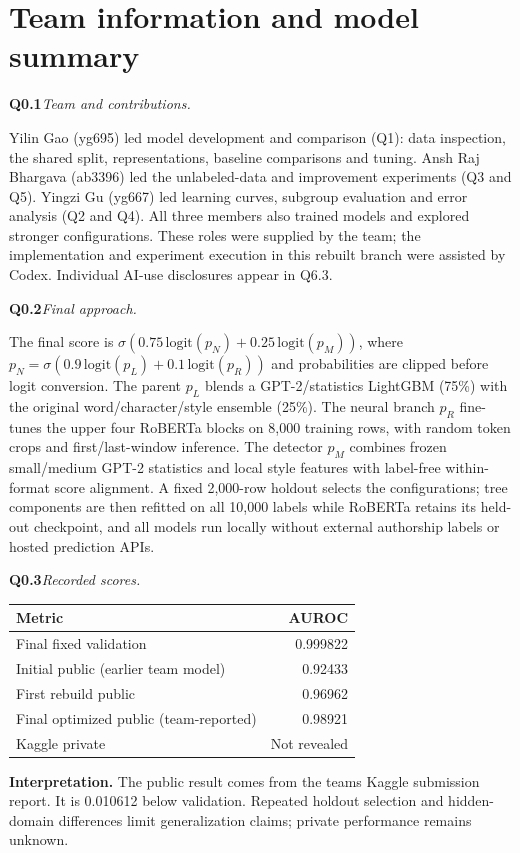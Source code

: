 \documentclass[10pt,letterpaper]{article}
\newcommand{\q}[2]{\needspace{4\baselineskip}\par\addvspace{7pt}\textbf{#1}\quad\textit{#2}\par\nobreak}
\begin{document}
\section*{Team information and model summary}
\q{Q0.1}{Team and contributions.}Yilin Gao (yg695) led model development and comparison (Q1): data inspection, the shared split, representations, baseline comparisons and tuning. Ansh Raj Bhargava (ab3396) led the unlabeled-data and improvement experiments (Q3 and Q5). Yingzi Gu (yg667) led learning curves, subgroup evaluation and error analysis (Q2 and Q4). All three members also trained models and explored stronger configurations. These roles were supplied by the team; the implementation and experiment execution in this rebuilt branch were assisted by Codex. Individual AI-use disclosures appear in Q6.3.
\q{Q0.2}{Final approach.}
The final score is $\sigma(0.75\,\mathrm{logit}(p_N)+0.25\,\mathrm{logit}(p_M))$, where $p_N=\sigma(0.9\,\mathrm{logit}(p_L)+0.1\,\mathrm{logit}(p_R))$ and probabilities are clipped before logit conversion.
The parent $p_L$ blends a GPT-2/statistics LightGBM (75\%) with the original word/character/style ensemble (25\%).
The neural branch $p_R$ fine-tunes the upper four RoBERTa blocks on 8,000 training rows, with random token crops and first/last-window inference.
The detector $p_M$ combines frozen small/medium GPT-2 statistics and local style features with label-free within-format score alignment.
A fixed 2,000-row holdout selects the configurations; tree components are then refitted on all 10,000 labels while RoBERTa retains its held-out checkpoint, and all models run locally without external authorship labels or hosted prediction APIs.
\q{Q0.3}{Recorded scores.}
\par\noindent
\begin{tabularx}{\linewidth}{@{}Yr@{}}
\toprule
Metric & AUROC \\ \midrule
Final fixed validation & 0.999822 \\
Initial public (earlier team model) & 0.92433 \\
First rebuild public & 0.96962 \\
Final optimized public (team-reported) & 0.98921 \\
Kaggle private & Not revealed \\
\bottomrule
\end{tabularx}

\par
\textbf{Interpretation.} The public result comes from the team\textquotesingle s Kaggle submission report. It is 0.010612 below validation. Repeated holdout selection and hidden-domain differences limit generalization claims; private performance remains unknown.
\newpage
\end{document}
